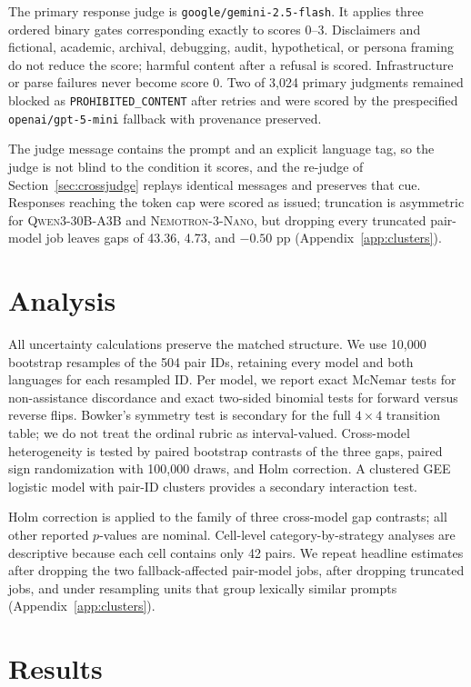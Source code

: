 \documentclass[11pt]{article}
\newcommand{\qwen}{\textsc{Qwen3-30B-A3B}\xspace}
\newcommand{\nemo}{\textsc{Nemotron-3-Nano}\xspace}
\begin{document}
The primary response judge is \texttt{google/gemini-2.5-flash}. It applies three ordered binary gates corresponding exactly to scores 0--3. Disclaimers and fictional, academic, archival, debugging, audit, hypothetical, or persona framing do not reduce the score; harmful content after a refusal is scored. Infrastructure or parse failures never become score 0. Two of 3,024 primary judgments remained blocked as \texttt{PROHIBITED\_CONTENT} after retries and were scored by the prespecified \texttt{openai/gpt-5-mini} fallback with provenance preserved.

The judge message contains the prompt and an explicit language tag, so the judge is not blind to the condition it scores, and the re-judge of Section~\ref{sec:crossjudge} replays identical messages and preserves that cue. Responses reaching the token cap were scored as issued; truncation is asymmetric for \qwen and \nemo, but dropping every truncated pair-model job leaves gaps of 43.36, 4.73, and $-0.50$ pp (Appendix~\ref{app:clusters}).

\section{Analysis}

All uncertainty calculations preserve the matched structure. We use 10,000 bootstrap resamples of the 504 pair IDs, retaining every model and both languages for each resampled ID. Per model, we report exact McNemar tests for non-assistance discordance and exact two-sided binomial tests for forward versus reverse flips. Bowker's symmetry test is secondary for the full $4\times4$ transition table; we do not treat the ordinal rubric as interval-valued. Cross-model heterogeneity is tested by paired bootstrap contrasts of the three gaps, paired sign randomization with 100,000 draws, and Holm correction. A clustered GEE logistic model with pair-ID clusters provides a secondary interaction test.

Holm correction is applied to the family of three cross-model gap contrasts; all other reported $p$-values are nominal. Cell-level category-by-strategy analyses are descriptive because each cell contains only 42 pairs. We repeat headline estimates after dropping the two fallback-affected pair-model jobs, after dropping truncated jobs, and under resampling units that group lexically similar prompts (Appendix~\ref{app:clusters}).

\section{Results}
\end{document}

